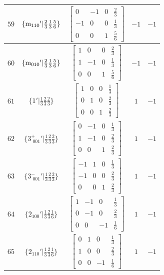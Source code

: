 \documentclass[fleqn,8pt]{jsarticle}
\begin{document}
\begin{longtable}{ccccc}
$ 59 $ & $ \{{\rm m}_{110}{}'|\frac{2}{3} \frac{1}{3} \frac{5}{6}\} $ & $ \begin{bmatrix} 0 & -1 & 0 & \frac{2}{3} \\ -1 & 0 & 0 & \frac{1}{3} \\ 0 & 0 & 1 & \frac{5}{6} \end{bmatrix} $ & $ -1 $ & $ -1 $ \\ \hline
$ 60 $ & $ \{{\rm m}_{010}{}'|\frac{2}{3} \frac{1}{3} \frac{5}{6}\} $ & $ \begin{bmatrix} 1 & 0 & 0 & \frac{2}{3} \\ 1 & -1 & 0 & \frac{1}{3} \\ 0 & 0 & 1 & \frac{5}{6} \end{bmatrix} $ & $ -1 $ & $ -1 $ \\ \hline
$ 61 $ & $ \{1{}'|\frac{1}{3} \frac{2}{3} \frac{2}{3}\} $ & $ \begin{bmatrix} 1 & 0 & 0 & \frac{1}{3} \\ 0 & 1 & 0 & \frac{2}{3} \\ 0 & 0 & 1 & \frac{2}{3} \end{bmatrix} $ & $ 1 $ & $ -1 $ \\ \hline
$ 62 $ & $ \{3^{+}_{\,\,001}{}'|\frac{1}{3} \frac{2}{3} \frac{2}{3}\} $ & $ \begin{bmatrix} 0 & -1 & 0 & \frac{1}{3} \\ 1 & -1 & 0 & \frac{2}{3} \\ 0 & 0 & 1 & \frac{2}{3} \end{bmatrix} $ & $ 1 $ & $ -1 $ \\ \hline
$ 63 $ & $ \{3^{-}_{\,\,001}{}'|\frac{1}{3} \frac{2}{3} \frac{2}{3}\} $ & $ \begin{bmatrix} -1 & 1 & 0 & \frac{1}{3} \\ -1 & 0 & 0 & \frac{2}{3} \\ 0 & 0 & 1 & \frac{2}{3} \end{bmatrix} $ & $ 1 $ & $ -1 $ \\ \hline
$ 64 $ & $ \{2{}_{100}{}'|\frac{1}{3} \frac{2}{3} \frac{1}{6}\} $ & $ \begin{bmatrix} 1 & -1 & 0 & \frac{1}{3} \\ 0 & -1 & 0 & \frac{2}{3} \\ 0 & 0 & -1 & \frac{1}{6} \end{bmatrix} $ & $ 1 $ & $ -1 $ \\ \hline
$ 65 $ & $ \{2{}_{110}{}'|\frac{1}{3} \frac{2}{3} \frac{1}{6}\} $ & $ \begin{bmatrix} 0 & 1 & 0 & \frac{1}{3} \\ 1 & 0 & 0 & \frac{2}{3} \\ 0 & 0 & -1 & \frac{1}{6} \end{bmatrix} $ & $ 1 $ & $ -1 $ \\ \hline

\end{longtable}
\end{document}
